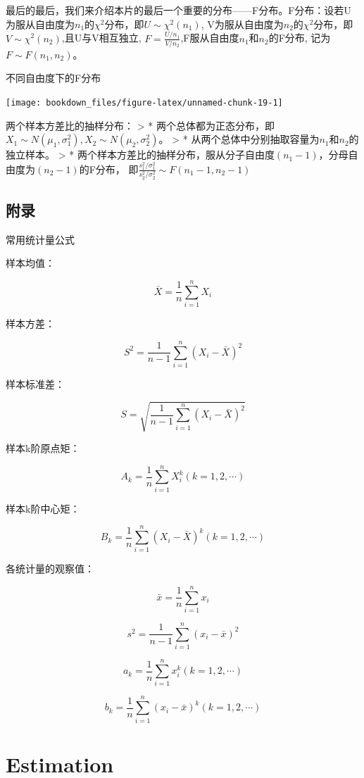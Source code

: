 \documentclass[]{ctexbook}
\begin{document}
最后的最后，我们来介绍本片的最后一个重要的分布------F分布。F分布：设若U为服从自由度为\(n_1\)的\(\chi^2\)分布，即\(U\sim \chi^2(n_1)\), V为服从自由度为\(n_2\)的\(\chi^2\)分布，即\(V\sim \chi^2(n_2)\),且U与V相互独立, \(F=\frac{U/n_1}{V/n_2}\),F服从自由度\(n_1\)和\(n_2\)的F分布, 记为\(F\sim F(n_1,n_2)\)。

不同自由度下的F分布

\texttt{[image: bookdown\_files/figure-latex/unnamed-chunk-19-1]}

两个样本方差比的抽样分布：
\textgreater{} * 两个总体都为正态分布，即\(X_1\sim N(\mu_1,\sigma_1^2), X_2\sim N (\mu_2,\sigma_2^2)\)。
\textgreater{} * 从两个总体中分别抽取容量为\(n_1\)和\(n_2\)的独立样本。
\textgreater{} * 两个样本方差比的抽样分布，服从分子自由度\((n_1-1)\)，分母自由度为\((n_2-1)\)的F分布， 即\(\frac{s_1^2/\sigma_1^2}{s_2^2/\sigma_2^2}\sim F(n_1-1,n_2-1)\)

\hypertarget{ux9644ux5f55}{%
\section{附录}\label{ux9644ux5f55}}

常用统计量公式

样本均值：

\[\bar X=\frac{1}{n} \sum_{i=1}^n{X_i}\]

样本方差：

\[S^2=\frac{1}{n-1} \sum_{i=1}^n(X_i-\bar X)^2\]

样本标准差：

\[S=\sqrt{\frac{1}{n-1} \sum_{i=1}^n(X_i-\bar X)^2}\]

样本k阶原点矩：

\[A_k=\frac{1}{n} \sum_{i=1}^nX_i^k(k=1,2,\cdots)\]

样本k阶中心矩：

\[B_k=\frac{1}{n} \sum_{i=1}^n(X_i-\bar X)^k(k=1,2,\cdots)\]

各统计量的观察值：

\[\bar x=\frac{1}{n} \sum_{i=1}^n{x_i}\]

\[s^2=\frac{1}{n-1} \sum_{i=1}^n(x_i-\bar x)^2\]

\[a_k=\frac{1}{n} \sum_{i=1}^nx_i^k(k=1,2,\cdots)\]

\[b_k=\frac{1}{n} \sum_{i=1}^n(x_i-\bar x)^k(k=1,2,\cdots)\]

\hypertarget{estimation}{%
\chapter{Estimation}\label{estimation}}
\end{document}
